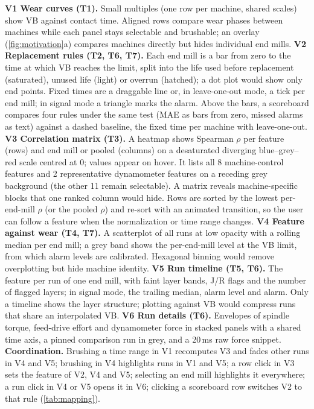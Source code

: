 \documentclass{vgtc}                          %
\begin{document}
\textbf{V1 Wear curves (T1).} Small multiples (one row per machine, shared scales) show VB against contact time. Aligned
rows compare wear phases between machines while each panel stays selectable and brushable; an overlay
(\cref{fig:motivation}a) compares machines directly but hides individual end mills.
\textbf{V2 Replacement rules (T2, T6, T7).} Each end mill is a bar from zero to the time at which VB reaches the limit,
split into the life used before replacement (saturated), unused life (light) or overrun (hatched); a dot plot would show
only end points. Fixed times are a draggable line or, in leave-one-out mode, a tick per end mill; in signal mode a
triangle marks the alarm. Above the bars, a scoreboard compares four rules under the same test (MAE as bars from zero,
missed alarms as text) against a dashed baseline, the fixed time per machine with leave-one-out.
\textbf{V3 Correlation matrix (T3).} A heatmap shows Spearman $\rho$ per feature (rows) and end mill or pooled (columns) on
a desaturated diverging blue--grey--red scale centred at 0; values appear on hover. It lists all 8 machine-control
features and 2 representative dynamometer features on a receding grey background (the other 11 remain selectable). A
matrix reveals machine-specific blocks that one ranked column would hide. Rows are sorted by the lowest per-end-mill
$\rho$ (or the pooled $\rho$) and re-sort with an animated transition, so the user can follow a feature when the
normalization or time range changes.
\textbf{V4 Feature against wear (T4, T7).} A scatterplot of all runs at low opacity with a rolling median per end mill;
a grey band shows the per-end-mill level at the VB limit, from which alarm levels are calibrated. Hexagonal binning would
remove overplotting but hide machine identity.
\textbf{V5 Run timeline (T5, T6).} The feature per run of one end mill, with faint layer bands, J/R flags and the number of
flagged layers; in signal mode, the trailing median, alarm level and alarm. Only a timeline shows the layer structure;
plotting against VB would compress runs that share an interpolated VB.
\textbf{V6 Run details (T6).} Envelopes of spindle torque, feed-drive effort and dynamometer force in stacked panels with a
shared time axis, a pinned comparison run in grey, and a 20\,ms raw force snippet.
\textbf{Coordination.} Brushing a time range in V1 recomputes V3 and fades other runs in V4 and V5; brushing in V4
highlights runs in V1 and V5; a row click in V3 sets the feature of V2, V4 and V5; selecting an end mill highlights it
everywhere; a run click in V4 or V5 opens it in V6; clicking a scoreboard row switches V2 to that rule (\cref{tab:mapping}).
\end{document}
